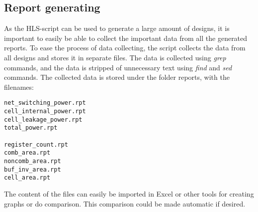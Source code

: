 \subsection{Report generating}
As the HLS-script can be used to generate a large amount of designs, it is important to easily be able to collect the important data from all the generated reports. To ease the process of data collecting, the script collects the data from all designs and stores it in separate files. The data is collected using \textit{grep} commands, and the data is stripped of unnecessary text using \textit{find} and \textit{sed} commands. The collected data is stored under the folder reports, with the filenames:
\begin{verbatim}
net_switching_power.rpt     
cell_internal_power.rpt     
cell_leakage_power.rpt      
total_power.rpt          

register_count.rpt
comb_area.rpt
noncomb_area.rpt
buf_inv_area.rpt
cell_area.rpt
\end{verbatim}

The content of the files can easily be imported in Excel or other tools for creating graphs or do comparison. This comparison could be made automatic if desired.